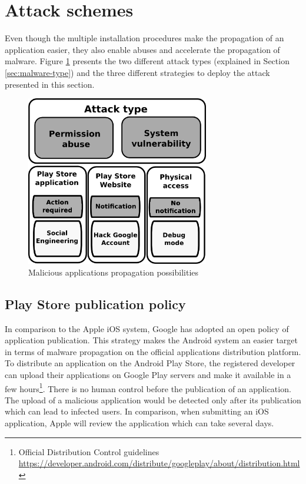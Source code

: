 \section{Attack schemes}
\label{sec:and-attack-scheme}

Even though the multiple installation procedures make the propagation of an application easier, they also enable abuses and accelerate the propagation of malware.
Figure \ref{fig:secu-graph} presents the two different attack types (explained in Section \ref{sec:malware-type}) and the three different strategies to deploy the attack presented in this section.

\begin{figure}[h]
  \centering
  \includegraphics[width=8cm]{images/secu-graph.png}
  \caption{Malicious applications propagation possibilities}
  \label{fig:secu-graph}
\end{figure}

\subsection{Play Store publication policy}
\label{sec:playstore-publication-policy}

In comparison to the Apple iOS system, Google has adopted an open policy of application publication.
This strategy makes the Android system an easier target in terms of malware propagation on the official applications distribution platform.\\

To distribute an application on the Android Play Store, the registered developer can upload their applications on Google Play servers and make it available in a few hours\footnote{Official Distribution Control guidelines \url{https://developer.android.com/distribute/googleplay/about/distribution.html}}.
There is no human control before the publication of an application.
The upload of a malicious application would be detected only after its publication which can lead to infected users.
In comparison, when submitting an iOS application, Apple will review the application which can take several days.\\

